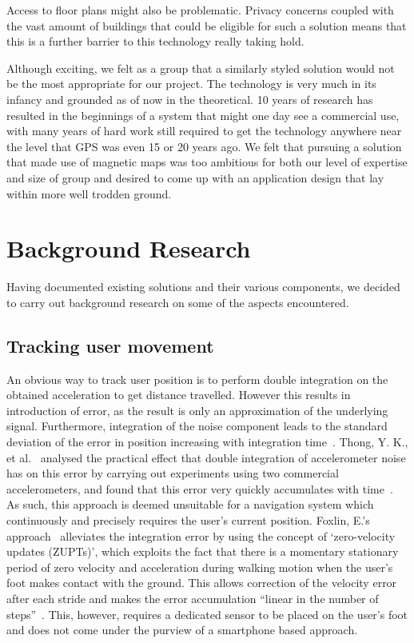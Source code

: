 \documentclass[12pt,a4paper]{report}
\begin{document}
 Access to floor plans might also be problematic. Privacy concerns coupled with the vast amount of buildings that could be eligible for such a solution means that this is a further barrier to this technology really taking hold.
 
Although exciting, we felt as a group that a similarly styled solution would not be the most appropriate for our project. The technology is very much in its infancy and grounded as of now in the theoretical. 10 years of research has resulted in the beginnings of a system that might one day see a commercial use, with many years of hard work still required to get the technology anywhere near the level that GPS was even 15 or 20 years ago. We felt that pursuing a solution that made use of magnetic maps was too ambitious for both our level of expertise and size of group and desired to come up with an application design that lay within more well trodden ground.

\chapter{Background Research}

Having documented existing solutions and their various components, we decided to carry out background research on some of the aspects encountered.

 \section{Tracking user movement}

An obvious way to track user position is to perform double integration on the obtained acceleration to get distance travelled. However this results in introduction of error, as the result is only an approximation of the underlying signal. Furthermore, integration of the noise component leads to the standard deviation of the error in position increasing with integration time~\cite[p.73]{integrationError}. Thong, Y. K., et al.~\cite{integrationErrorPractical} analysed the practical effect that double integration of accelerometer noise has on this error by carrying out experiments using two commercial accelerometers, and found that this error very quickly accumulates with time~\cite[p.1168]{integrationErrorPractical}. As such, this approach is deemed unsuitable for a navigation system which continuously and precisely requires the user’s current position. Foxlin, E.'s approach~\cite{foxlin2005pedestrian} alleviates the integration error by using the concept of `zero-velocity updates (ZUPTs)’, which exploits the fact that there is a momentary stationary period of zero velocity and acceleration during walking motion when the user’s foot makes contact with the ground. This allows correction of the velocity error after each stride and makes the error accumulation ``linear in the number of steps''~\cite[p.38]{foxlin2005pedestrian}. This, however, requires a dedicated sensor to be placed on the user’s foot and does not come under the purview of a smartphone based approach. 
\end{document}
